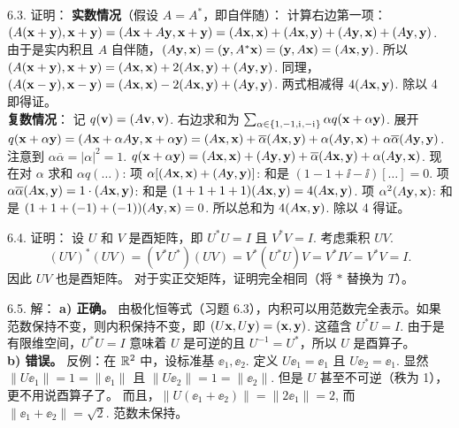 \begin{exer}
6.3. 证明：
\textbf{实数情况}（假设 $A=A^*$，即自伴随）：
计算右边第一项：
$(A(\mathbf{x}+\mathbf{y}), \mathbf{x}+\mathbf{y}) = (A\mathbf{x}+A\mathbf{y}, \mathbf{x}+\mathbf{y}) = (A\mathbf{x}, \mathbf{x}) + (A\mathbf{x}, \mathbf{y}) + (A\mathbf{y}, \mathbf{x}) + (A\mathbf{y}, \mathbf{y})$.
由于是实内积且 $A$ 自伴随，$(A\mathbf{y}, \mathbf{x}) = (\mathbf{y}, A^*\mathbf{x}) = (\mathbf{y}, A\mathbf{x}) = (A\mathbf{x}, \mathbf{y})$.
所以 $(A(\mathbf{x}+\mathbf{y}), \mathbf{x}+\mathbf{y}) = (A\mathbf{x}, \mathbf{x}) + 2(A\mathbf{x}, \mathbf{y}) + (A\mathbf{y}, \mathbf{y})$.
同理，
$(A(\mathbf{x}-\mathbf{y}), \mathbf{x}-\mathbf{y}) = (A\mathbf{x}, \mathbf{x}) - 2(A\mathbf{x}, \mathbf{y}) + (A\mathbf{y}, \mathbf{y})$.
两式相减得 $4(A\mathbf{x}, \mathbf{y})$. 除以 4 即得证。
\\
\textbf{复数情况}：
记 $q(\mathbf{v}) = (A\mathbf{v}, \mathbf{v})$. 右边求和为 $\sum_{\alpha \in \{1, -1, \mathrm{i}\mkern1mu, -\mathrm{i}\mkern1mu\}} \alpha q(\mathbf{x}+\alpha\mathbf{y})$.
展开 $q(\mathbf{x}+\alpha\mathbf{y}) = (A\mathbf{x} + \alpha A\mathbf{y}, \mathbf{x} + \alpha\mathbf{y}) = (A\mathbf{x}, \mathbf{x}) + \overline{\alpha}(A\mathbf{x}, \mathbf{y}) + \alpha(A\mathbf{y}, \mathbf{x}) + \alpha\overline{\alpha}(A\mathbf{y}, \mathbf{y})$.
注意到 $\alpha\overline{\alpha} = |\alpha|^2 = 1$.
$q(\mathbf{x}+\alpha\mathbf{y}) = (A\mathbf{x}, \mathbf{x}) + (A\mathbf{y}, \mathbf{y}) + \overline{\alpha}(A\mathbf{x}, \mathbf{y}) + \alpha(A\mathbf{y}, \mathbf{x})$.
现在对 $\alpha$ 求和 $\alpha q(\dots)$:
项 $\alpha [ (A\mathbf{x}, \mathbf{x}) + (A\mathbf{y}, \mathbf{y}) ]$: 和是 $(1-1+\ii-\ii)[\dots] = 0$.
项 $\alpha \overline{\alpha} (A\mathbf{x}, \mathbf{y}) = 1 \cdot (A\mathbf{x}, \mathbf{y})$: 和是 $(1+1+1+1)(A\mathbf{x}, \mathbf{y}) = 4(A\mathbf{x}, \mathbf{y})$.
项 $\alpha^2 (A\mathbf{y}, \mathbf{x})$: 和是 $(1 + 1 + (-1) + (-1))(A\mathbf{y}, \mathbf{x}) = 0$.
所以总和为 $4(A\mathbf{x}, \mathbf{y})$. 除以 4 得证。

6.4. 证明：
设 $U$ 和 $V$ 是酉矩阵，即 $U^*U = I$ 且 $V^*V = I$.
考虑乘积 $UV$.
$$ (UV)^* (UV) = (V^* U^*) (UV) = V^* (U^* U) V = V^* I V = V^* V = I. $$
因此 $UV$ 也是酉矩阵。
对于实正交矩阵，证明完全相同（将 $*$ 替换为 $T$）。

6.5. 解：
\textbf{a) 正确。}
由极化恒等式（习题 6.3），内积可以用范数完全表示。如果范数保持不变，则内积保持不变，即 $(U\mathbf{x}, U\mathbf{y}) = (\mathbf{x}, \mathbf{y})$.
这蕴含 $U^*U = I$. 由于是有限维空间，$U^*U=I$ 意味着 $U$ 是可逆的且 $U^{-1}=U^*$，所以 $U$ 是酉算子。
\\
\textbf{b) 错误。}
反例：在 $\mathbb{R}^2$ 中，设标准基 $\ee_1, \ee_2$.
定义 $U\ee_1 = \ee_1$ 且 $U\ee_2 = \ee_1$.
显然 $\|U\ee_1\| = 1 = \|\ee_1\|$ 且 $\|U\ee_2\| = 1 = \|\ee_2\|$.
但是 $U$ 甚至不可逆（秩为 1），更不用说酉算子了。
而且，$\|U(\ee_1+\ee_2)\| = \|2\ee_1\| = 2$, 而 $\|\ee_1+\ee_2\| = \sqrt{2}$. 范数未保持。


\end{exer}
